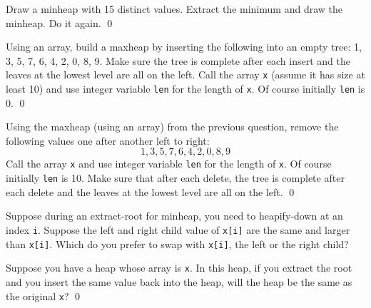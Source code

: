 \newpage
\begin{ex}
  Draw a minheap with 15 distinct values.
  Extract the minimum and draw the minheap.
  Do it again.
  \qed
\end{ex}





\begin{ex}
Using an array, 
build a maxheap by inserting the following into an empty tree:
1, 3, 5, 7, 6, 4, 2, 0, 8, 9.
Make sure the tree is complete after each insert and the leaves
at the lowest level are all on the left.
Call the array \texttt{x}
(assume it has size at least 10)
and use integer variable \texttt{len}
for the length of \texttt{x}.
Of course initially \texttt{len} is 0.
\qed
\end{ex}

\begin{ex}
Using the maxheap (using an array) from the previous question,
remove the following values one after another left to right:
\[
1, 3, 5, 7, 6, 4, 2, 0, 8, 9
\]
Call the array \texttt{x} and use integer variable \texttt{len}
for the length of \texttt{x}.
Of course initially \texttt{len} is 10.
Make sure that after each delete, the tree is complete after each delete and 
the leaves
at the lowest level are all on the left.
\qed
\end{ex}

\begin{ex}
  Suppose during an extract-root for minheap,
  you need to heapify-down at an index \verb!i!.
  Suppose the left and right child value of \verb!x[i]! are the same and
  larger than \verb!x[i]!.
  Which do you prefer to swap with \verb!x[i]!, the left or the right
  child?
\end{ex}
%

\begin{ex}
  Suppose you have a heap whose array is \verb!x!.
  In this heap, if you extract the root and you insert the same value back
  into the heap, will the heap be the same as the original \verb!x!?
  \qed
\end{ex}
%
%
%
